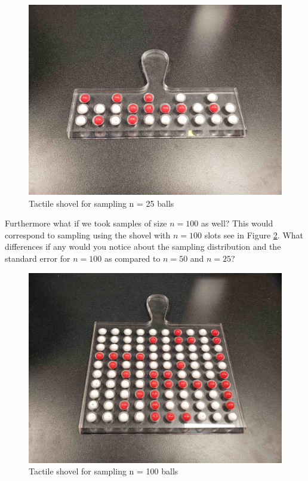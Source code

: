 \documentclass[12pt,]{krantz}
\theoremstyle{definition}
\theoremstyle{definition}
\theoremstyle{definition}
\theoremstyle{remark}
\begin{document}
\begin{figure}

{\centering \includegraphics[width=0.8\linewidth]{images/sampling/shovel_025} 

}

\caption{Tactile shovel for sampling n = 25 balls}\label{fig:shovel-n-25}
\end{figure}

Furthermore what if we took samples of size \(n=100\) as well? This
would correspond to sampling using the shovel with \(n=100\) slots see
in Figure \ref{fig:shovel-n-100}. What differences if any would you
notice about the sampling distribution and the standard error for
\(n=100\) as compared to \(n=50\) and \(n=25\)?

\begin{figure}

{\centering \includegraphics[width=0.8\linewidth]{images/sampling/shovel_100} 

}

\caption{Tactile shovel for sampling n = 100 balls}\label{fig:shovel-n-100}
\end{figure}
\end{document}
